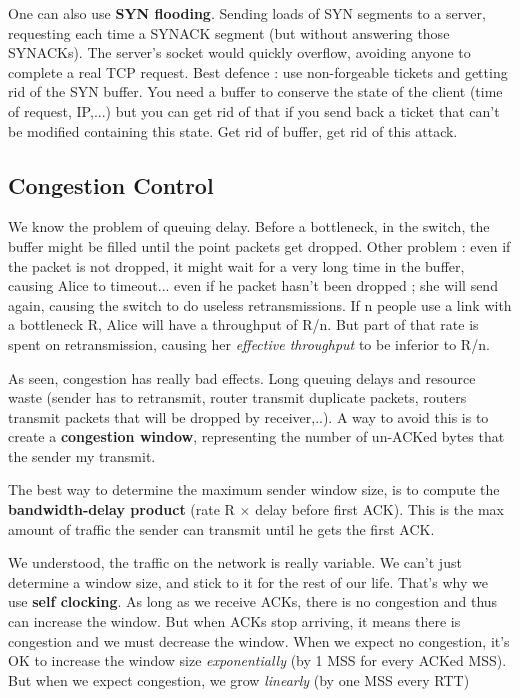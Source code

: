 \documentclass[12pt,a4paper]{article}
\begin{document}
One can also use \textbf{SYN flooding}. Sending loads of SYN segments to a server, requesting each time a SYNACK segment (but without answering those SYNACKs). The server's socket would quickly overflow, avoiding anyone to complete a real TCP request. Best defence : use non-forgeable tickets and getting rid of the SYN buffer. You need a buffer to conserve the state of the client (time of request, IP,...) but you can get rid of that if you send back a ticket that can't be modified containing this state. Get rid of buffer, get rid of this attack.
\subsection{Congestion Control}
We know the problem of queuing delay. Before a bottleneck, in the switch, the buffer might be filled until the point packets get dropped. Other problem : even if the packet is not dropped, it might wait for a very long time in the buffer, causing Alice to timeout... even if he packet hasn't been dropped ; she will send again, causing the switch to do useless retransmissions. If n people use a link with a bottleneck R, Alice will have a throughput of R/n. But part of that rate is spent on retransmission, causing her \textit{effective throughput} to be inferior to R/n.

As seen, congestion has really bad effects. Long queuing delays and resource waste (sender has to retransmit, router transmit duplicate packets, routers transmit packets that will be dropped by receiver,..). A way to avoid this is to create a \textbf{congestion window}, representing the number of un-ACKed  bytes that the sender my transmit. 

The best way to determine the maximum sender window size, is to compute the \textbf{bandwidth-delay product} (rate R $\times$ delay before first ACK). This is the max amount of traffic the sender can transmit until he gets the first ACK.

We understood, the traffic on the network is really variable. We can't just determine a window size, and stick to it for the rest of our life. That's why we use \textbf{self clocking}. As long as we receive ACKs, there is no congestion and thus can increase the window. But when ACKs stop arriving, it means there is congestion and we must decrease the window. When we expect no congestion, it's OK to increase the window size \textit{exponentially} (by 1 MSS for every ACKed MSS). But when we expect congestion, we grow \textit{linearly} (by one MSS every RTT)
\end{document}

